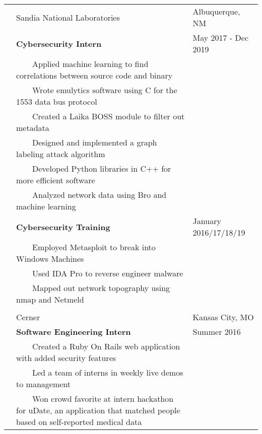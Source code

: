\documentclass[10.5pt, arial]{article}
\newcommand{\tabitem}{~~\llap{\textbullet}~~}
\begin{document}
\begin{longtable}{p{1.5cm} p{13.2cm} l}
            & Sandia National Laboratories	& Albuquerque, NM 		\\
			& \textbf{Cybersecurity Intern}										& May 2017 - Dec 2019 	\\
			& \tabitem Applied machine learning to find correlations between source code and binary & 	\\
			& \tabitem Wrote emulytics software using C for the 1553 data bus protocol 	&			\\
			& \tabitem Created a Laika BOSS module to filter out metadata		&						\\
            & \tabitem Designed and implemented a graph labeling attack algorithm 	&     				\\
            & \tabitem Developed Python libraries in C++ for more efficient software 	& 				\\
            & \tabitem Analyzed network data using Bro and machine learning 			& 				\\
            & \textbf{Cybersecurity Training} 									& January 2016/17/18/19 \\
			& \tabitem Employed Metasploit to break into Windows Machines		&	 					\\
			& \tabitem Used IDA Pro to reverse engineer malware 				& 						\\
			& \tabitem Mapped out network topography using nmap and Netmeld		&						\\ \\
\pagebreak
			& Cerner 															& Kansas City, MO 		\\
			& \textbf{Software Engineering Intern} 								& Summer 2016			\\
			& \tabitem Created a Ruby On Rails web application with added security features	& 			\\
			& \tabitem Led a team of interns in weekly live demos to management 			&    		\\
            & \tabitem Won crowd favorite at intern hackathon for uDate, an application that matched people based on self-reported medical data   &                       \\
\end{longtable}
\end{document}
